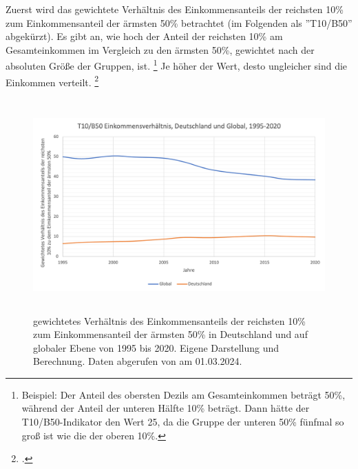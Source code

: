 Zuerst wird das gewichtete Verhältnis des Einkommensanteils der reichsten 10\% zum Einkommensanteil der ärmsten 50\% betrachtet (im Folgenden als ''T10/B50'' abgekürzt). Es gibt an, wie hoch der Anteil der reichsten 10\% am Gesamteinkommen im Vergleich zu den ärmsten 50\%, gewichtet nach der absoluten Grö{\ss}e der Gruppen, ist. \footnote{Beispiel: Der Anteil des obersten Dezils am Gesamteinkommen beträgt 50\%, während der Anteil der unteren Hälfte 10\% beträgt. Dann hätte der T10/B50-Indikator den Wert 25, da die Gruppe der unteren 50\% fünfmal so gro{\ss} ist wie die der oberen 10\%.} Je höher der Wert, desto ungleicher sind die Einkommen verteilt. \footcite[Vgl.][S. 31]{wir_2022} 

\begin{figure}[h]
    \centering
    \includegraphics[height=8.15cm]{Bilder/T10B50-Ratio3.png}
    \caption[T10/B50 Einkommensverhältnis, Deutschland und global, 1995-2020]{gewichtetes Verhältnis des Einkommensanteils der reichsten 10\% zum Einkommensanteil der ärmsten 50\% in Deutschland und auf globaler Ebene von 1995 bis 2020. Eigene Darstellung und Berechnung. Daten abgerufen von \cite[][, S.55, 195]{wir_2022} am 01.03.2024.}
    \label{fig:iso_norm}
\end{figure}

